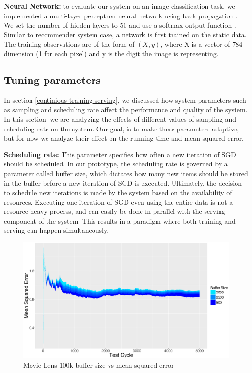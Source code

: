 \documentclass{vldb}
\begin{document}
\textbf{Neural Network:} to evaluate our system on an image classification task, we implemented a multi-layer perceptron neural network using back propagation \cite{collobert2004links}.
We set the number of hidden layers to 50 and use a softmax output function \cite{bishop2006pattern}.
Similar to recommender system case, a network is first trained on the static data.
The training observations are of the form of \textit{\((X,y)\)}, where X is a vector of 784 dimension (1 for each pixel) and y is the digit the image is representing.

\subsection{Tuning parameters} \label{tuning}
In section \ref{continious-training-serving}, we discussed how system parameters such as sampling and scheduling rate affect the performance and quality of the system.
In this section, we are analyzing the effects of different values of sampling and scheduling rate on the system.
Our goal, is to make these parameters adaptive, but for now we analyze their effect on the running time and mean squared error. 

\textbf{Scheduling rate:} This parameter specifies how often a new iteration of SGD should be scheduled. 
In our prototype, the scheduling rate is governed by a parameter called buffer size, which dictates how many new items should be stored in the buffer before a new iteration of SGD is executed. 
Ultimately, the decision to schedule new iterations is made by the system based on the availability of resources. 
Executing one iteration of SGD even using the entire data is not a resource heavy process, and can easily be done in parallel with the serving component of the system. 
This results in a paradigm where both training and serving can happen simultaneously. 

\begin{figure}[H]
\centering
\includegraphics[width=\columnwidth]{../images/experiment-results/movie-lens-100k-buffer-size-improved.eps}
\caption{Movie Lens 100k buffer size vs mean squared error}
\label{fig:movie-lens-100k-buffer-size-mse}
\end{figure}
\end{document}

